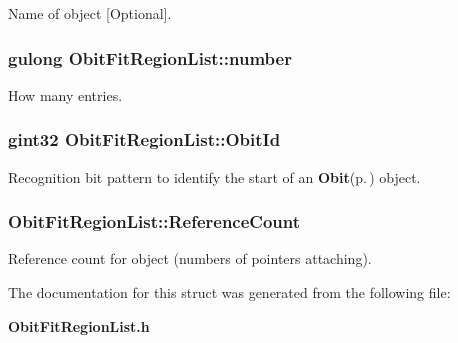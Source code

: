 Name of object [Optional]. 

\subsubsection{\setlength{\rightskip}{0pt plus 5cm}gulong {\bf Obit\-Fit\-Region\-List::number}}\label{structObitFitRegionList_o6}


How many entries. 

\subsubsection{\setlength{\rightskip}{0pt plus 5cm}gint32 {\bf Obit\-Fit\-Region\-List::Obit\-Id}}\label{structObitFitRegionList_o0}


Recognition bit pattern to identify the start of an {\bf Obit}{\rm (p.\,\pageref{structObit})} object. 

\subsubsection{ {\bf Obit\-Fit\-Region\-List::Reference\-Count}}\label{structObitFitRegionList_o2}


Reference count for object (numbers of pointers attaching). 



The documentation for this struct was generated from the following file:\begin{CompactItemize}
\item 
{\bf Obit\-Fit\-Region\-List.h}\end{CompactItemize}
